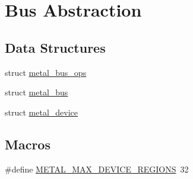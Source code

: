 \hypertarget{group__device}{}\section{Bus Abstraction}
\label{group__device}
\subsection*{Data Structures}
\begin{DoxyCompactItemize}
\item 
struct \hyperlink{structmetal__bus__ops}{metal\+\_\+bus\+\_\+ops}
\item 
struct \hyperlink{structmetal__bus}{metal\+\_\+bus}
\item 
struct \hyperlink{structmetal__device}{metal\+\_\+device}
\end{DoxyCompactItemize}
\subsection*{Macros}
\begin{DoxyCompactItemize}
\item 
\#define \hyperlink{group__device_gade1e205242a3d9e8ec25535d263aa664}{M\+E\+T\+A\+L\+\_\+\+M\+A\+X\+\_\+\+D\+E\+V\+I\+C\+E\+\_\+\+R\+E\+G\+I\+O\+NS}~32
\end{DoxyCompactItemize}
